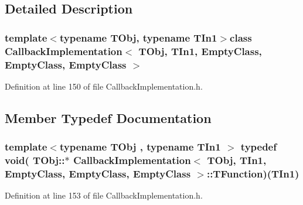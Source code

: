 \subsection{Detailed Description}
\subsubsection*{template$<$typename T\-Obj, typename T\-In1$>$class Callback\-Implementation$<$ T\-Obj, T\-In1, Empty\-Class, Empty\-Class, Empty\-Class $>$}



Definition at line 150 of file Callback\-Implementation.\-h.



\subsection{Member Typedef Documentation}
\hypertarget{class_callback_implementation_3_01_t_obj_00_01_t_in1_00_01_empty_class_00_01_empty_class_00_01_empty_class_01_4_aa325010e421eadd021d63ed4d542a5fe}{
\subsubsection[{T\-Function}]{\setlength{\rightskip}{0pt plus 5cm}template$<$typename T\-Obj , typename T\-In1 $>$ typedef void( T\-Obj\-::$\ast$ {\bf Callback\-Implementation}$<$ T\-Obj, T\-In1, {\bf Empty\-Class}, {\bf Empty\-Class}, {\bf Empty\-Class} $>$\-::T\-Function)(T\-In1)}}\label{class_callback_implementation_3_01_t_obj_00_01_t_in1_00_01_empty_class_00_01_empty_class_00_01_empty_class_01_4_aa325010e421eadd021d63ed4d542a5fe}


Definition at line 153 of file Callback\-Implementation.\-h.



